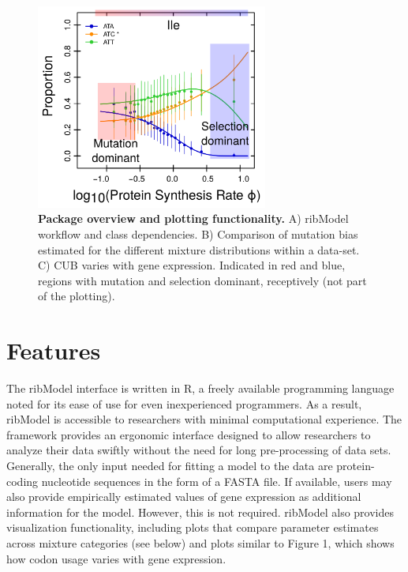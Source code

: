 \documentclass{bioinfo}
\newcommand{\package}{ribModel } %
\begin{document}
\begin{figure}[!tpb]
\centering
 \includegraphics[width=3in]{expl_model.png}
\vspace{-0.2cm}
\caption{\textbf{Package overview and plotting functionality.} A) \package workflow and class dependencies. B) Comparison of mutation bias estimated for the different mixture distributions within a data-set. C) CUB varies with gene expression. Indicated in red and blue, regions with mutation and selection dominant, receptively (not part of the plotting). 
}
\label{fig:plotbin}
\end{figure}

\section*{Features}
The \package interface is written in R, a freely available programming language noted for its ease of use for even inexperienced programmers. As a result, \package is accessible to researchers with minimal computational experience. The framework provides an ergonomic interface designed to allow researchers to analyze their data swiftly without the need for long pre-processing of data sets. Generally, the only input needed for fitting a model to the data are protein-coding nucleotide sequences in the form of a FASTA file. If available, users may also provide empirically estimated values of gene expression as additional information for the model. However, this is not required.
\package also provides visualization functionality, including plots that compare parameter estimates across mixture categories (see below) and plots similar to Figure 1, which shows how codon usage varies with gene expression.    
\end{document}
